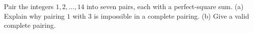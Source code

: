 Pair the integers $1,2,\ldots,14$ into seven pairs, each with a perfect-square sum. (a) Explain why pairing $1$ with $3$ is impossible in a complete pairing. (b) Give a valid complete pairing.
